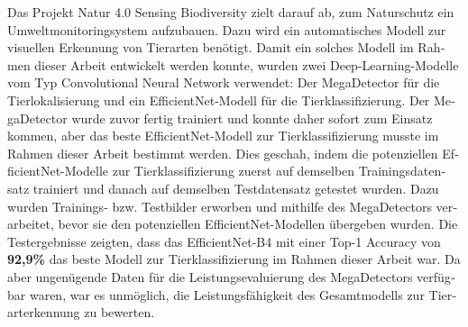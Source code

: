 
%
%



\null\vfil
\begin{otherlanguage}{ngerman}
\begin{center}\textsf{\textbf{\abstractname}}\end{center}

\noindent Das Projekt Natur 4.0 Sensing Biodiversity zielt darauf ab, zum Naturschutz ein Umweltmonitoringsystem aufzubauen. Dazu wird ein automatisches Modell zur visuellen Erkennung von Tierarten benötigt. Damit ein solches Modell im Rahmen dieser Arbeit entwickelt werden konnte, wurden zwei Deep-Learning-Modelle vom Typ Convolutional Neural Network verwendet: Der MegaDetector für die Tierlokalisierung und ein EfficientNet-Modell für die Tierklassifizierung. Der MegaDetector wurde zuvor fertig trainiert und konnte daher sofort zum Einsatz kommen, aber das beste EfficientNet-Modell zur Tierklassifizierung musste im Rahmen dieser Arbeit bestimmt werden. Dies geschah, indem die potenziellen EfficientNet-Modelle zur Tierklassifizierung zuerst auf demselben Trainingsdatensatz trainiert und danach auf demselben Testdatensatz getestet wurden. Dazu wurden Trainings- bzw. Testbilder erworben und mithilfe des MegaDetectors verarbeitet, bevor sie den potenziellen EfficientNet-Modellen übergeben wurden. Die Testergebnisse zeigten, dass das EfficientNet-B4 mit einer Top-1 Accuracy von \textbf{92,9\%} das beste Modell zur Tierklassifizierung im Rahmen dieser Arbeit war. Da aber ungenügende Daten für die Leistungsevaluierung des MegaDetectors verfügbar waren, war es unmöglich, die Leistungsfähigkeit des Gesamtmodells zur Tierarterkennung zu bewerten.

\end{otherlanguage}
\vfil\null




